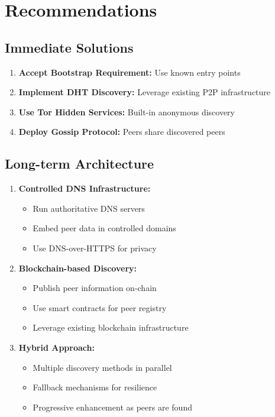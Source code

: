 \documentclass[12pt,a4paper]{article}
\begin{document}
\section{Recommendations}

\subsection{Immediate Solutions}

\begin{enumerate}
    \item \textbf{Accept Bootstrap Requirement:} Use known entry points
    \item \textbf{Implement DHT Discovery:} Leverage existing P2P infrastructure
    \item \textbf{Use Tor Hidden Services:} Built-in anonymous discovery
    \item \textbf{Deploy Gossip Protocol:} Peers share discovered peers
\end{enumerate}

\subsection{Long-term Architecture}

\begin{enumerate}
    \item \textbf{Controlled DNS Infrastructure:}
    \begin{itemize}
        \item Run authoritative DNS servers
        \item Embed peer data in controlled domains
        \item Use DNS-over-HTTPS for privacy
    \end{itemize}

    \item \textbf{Blockchain-based Discovery:}
    \begin{itemize}
        \item Publish peer information on-chain
        \item Use smart contracts for peer registry
        \item Leverage existing blockchain infrastructure
    \end{itemize}

    \item \textbf{Hybrid Approach:}
    \begin{itemize}
        \item Multiple discovery methods in parallel
        \item Fallback mechanisms for resilience
        \item Progressive enhancement as peers are found
    \end{itemize}
\end{enumerate}
\end{document}

